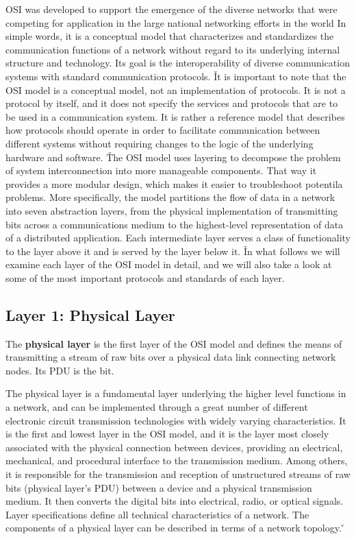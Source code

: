 OSI was developed to support the emergence of the diverse networks that were competing for application in the large
national networking efforts in the world In simple words, it is a conceptual model that characterizes and
standardizes the communication functions of a network without regard to its underlying internal structure and
technology. Its goal is the interoperability of diverse communication systems with standard communication protocols. \v

It is important to note that the OSI model is a conceptual model, not an implementation of protocols. It is not a
protocol by itself, and it does not specify the services and protocols that are to be used in a communication system.
It is rather a reference model that describes how protocols should operate in order to facilitate communication
between different systems without requiring changes to the logic of the underlying hardware and software. \v

The OSI model uses layering to decompose the problem of system interconnection into more manageable components. That
way it provides a more modular design, which makes it easier to troubleshoot potentila problems. More specifically,
the model partitions the flow of data in a network into seven abstraction layers, from the physical implementation of
transmitting bits across a communications medium to the highest-level representation of data of a distributed
application. Each intermediate layer serves a class of functionality to the layer above it and is served by the layer
below it. \v

In what follows we will examine each layer of the OSI model in detail, and we will also take a look at some of the
most important protocols and standards of each layer.


\subsection{Layer 1: Physical Layer}

The \textbf{physical layer} is the first layer of the OSI model and defines the means of transmitting a stream of raw
bits over a physical data link connecting network nodes. Its PDU is the bit.
\ed

The physical layer is a fundamental layer underlying the higher level functions in a network, and can be implemented
through a great number of different electronic circuit transmission technologies with widely varying characteristics.
It is the first and lowest layer in the OSI model, and it is the layer most closely associated with the physical
connection between devices, providing an electrical, mechanical, and procedural interface to the transmission medium.
Among others, it is responsible for the transmission and reception of unstructured streams of raw bits (physical layer's
PDU) between a device and a physical transmission medium. It then converts the digital bits into electrical, radio, or
optical signals. Layer specifications define all technical characteristics of a network. The components of a physical
layer can be described in terms of a network topology. \v

